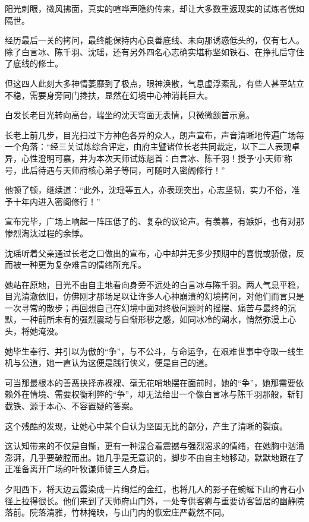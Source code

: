 阳光刺眼，微风拂面，真实的喧哗声隐约传来，却让大多数重返现实的试炼者恍如隔世。

经历最后一关的拷问，最终能保持内心良善底线、未向那诱惑低头的，仅有七人。除了白言冰、陈千羽、沈瑶，还有另外四名心志确实堪称坚如铁石、在挣扎后守住了底线的修士。

但这四人此刻大多神情萎靡到了极点，眼神涣散，气息虚浮紊乱，有些人甚至站立不稳，需要身旁同门搀扶，显然在幻境中心神消耗巨大。

白发长老目光转向高台，端坐的沈天穹面无表情，只微微颔首示意。

长老上前几步，目光扫过下方神色各异的众人，朗声宣布，声音清晰地传遍广场每一个角落：“经三关试炼综合评定，由府主暨诸位长老共同裁定，以下二人表现卓异，心性澄明可嘉，并为本次天师试炼魁首：白言冰、陈千羽！授予‘小天师’称号，此后待遇与天师府核心弟子等同，可随时入密阁修行！”

他顿了顿，继续道：“此外，沈瑶等五人，亦表现突出，心志坚韧，实力不俗，准予十年内进入密阁修行！”

宣布完毕，广场上响起一阵压低了的、复杂的议论声。有羡慕，有嫉妒，也有对那惨烈淘汰过程的余悸。

\vspace{2em}

沈瑶听着父亲通过长老之口做出的宣布，心中却并无多少预期中的喜悦或骄傲，反而被一种更为复杂难言的情绪所充斥。

她站在原地，目光不由自主地看向身旁不远处的白言冰与陈千羽。两人气息平稳，目光清澈依旧，仿佛刚才那场足以让许多人心神崩溃的幻境拷问，对他们而言只是一次寻常的散步；再回想自己在幻境中面对终极问题时的摇摆、痛苦与最终的沉默，一种前所未有的强烈震动与自惭形秽之感，如同冰冷的潮水，悄然弥漫上心头，将她淹没。

她毕生奉行、并引以为傲的“争”，与不公斗，与命运争，在艰难世事中夺取一线生机与公道，她一直认为这便是践行侠义，便是自己的道。

可当那最根本的善恶抉择赤裸裸、毫无花哨地摆在面前时，她的“争”，她那需要依赖外在情境、需要权衡利弊的“争”，却无法给出一个像白言冰与陈千羽那般，斩钉截铁、源于本心、不容置疑的答案。

这个残酷的发现，让她心中某个自认为坚固无比的部分，产生了清晰的裂痕。

这认知带来的不仅是自惭，更有一种混合着震撼与强烈渴求的情绪，在她胸中汹涌澎湃，几乎要破膛而出。她几乎是无意识的，脚步不由自主地移动，默默地跟在了正准备离开广场的叶牧谦师徒三人身后。

夕阳西下，将天边云霞染成一片绚烂的金红，也将几人的影子在蜿蜒下山的青石小径上拉得很长。他们来到了天师府山门外，一处专供客卿与重要访客暂居的幽静院落前。院落清雅，竹林掩映，与山门内的恢宏庄严截然不同。

